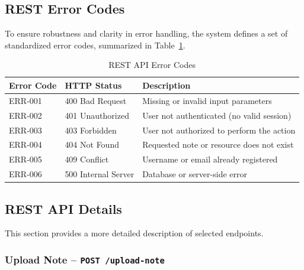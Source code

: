 \documentclass[12pt, a4paper]{article}
\begin{document}
    \subsection{REST Error Codes}

    To ensure robustness and clarity in error handling, the system defines a set
    of standardized error codes, summarized in Table~\ref{tab:error-codes}.

    \begin{table}[H]
        \centering
        \caption{REST API Error Codes}
        \begin{tabular}{lll}
            \toprule
            \textbf{Error Code} & \textbf{HTTP Status} & \textbf{Description} \\
            \midrule
            ERR-001 & 400 Bad Request      & Missing or invalid input parameters \\
            ERR-002 & 401 Unauthorized     & User not authenticated (no valid session) \\
            ERR-003 & 403 Forbidden        & User not authorized to perform the action \\
            ERR-004 & 404 Not Found        & Requested note or resource does not exist \\
            ERR-005 & 409 Conflict         & Username or email already registered \\
            ERR-006 & 500 Internal Server  & Database or server-side error \\
            \bottomrule
        \end{tabular}
        \label{tab:error-codes}
    \end{table}

    \subsection{REST API Details}

    This section provides a more detailed description of selected endpoints.

    \subsubsection{Upload Note -- \texttt{POST /upload-note}}
\end{document}
